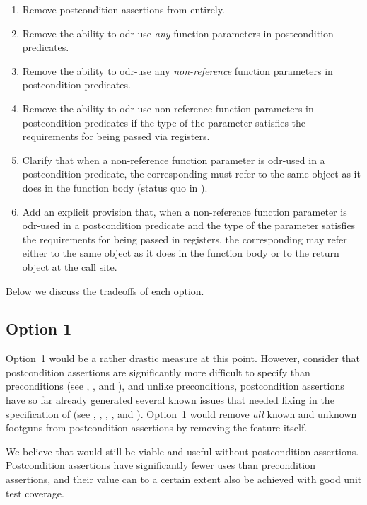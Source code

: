 \begin{enumerate}
\item Remove postcondition assertions from \cite{P2900R10} entirely.
\item Remove the ability to odr-use \emph{any} function parameters in postcondition predicates.
\item Remove the ability to odr-use any \emph{non-reference} function parameters in postcondition predicates.
\item Remove the ability to odr-use non-reference function parameters in postcondition predicates if the type of the parameter satisfies the requirements for being passed via registers.
\item Clarify that when a non-reference function parameter is odr-used in a postcondition predicate, the corresponding  must refer to the same object as it does in the function body (status quo in \cite{P2900R10}).
\item Add an explicit provision that, when a non-reference function parameter is odr-used in a postcondition predicate and the type of the parameter satisfies the requirements for being passed in registers, the corresponding  may refer either to the same object as it does in the function body or to the return object at the call site.
\end{enumerate}

Below we discuss the tradeoffs of each option.

\subsection*{Option 1}

Option~1 would be a rather drastic measure at this point. However, consider that postcondition assertions are significantly more difficult to specify than preconditions (see \cite{P1323R2}, \cite{P3007R0}, and \cite{P3098R0}), and unlike preconditions, postcondition assertions have so far already generated several known issues that needed fixing in the specification of \cite{P2900R10} (see \cite{P3387R0}, \cite{P3460R0}, \cite{P3483R0}, \cite{D3484R1}, and \cite{D3489R0}). Option~1 would remove \emph{all} known and unknown footguns from postcondition assertions by removing the feature itself.

We believe that \cite{P2900R10} would still be viable and useful without postcondition assertions. Postcondition assertions have significantly fewer uses than precondition assertions, and their value can to a certain extent also be achieved with good unit test coverage. 

